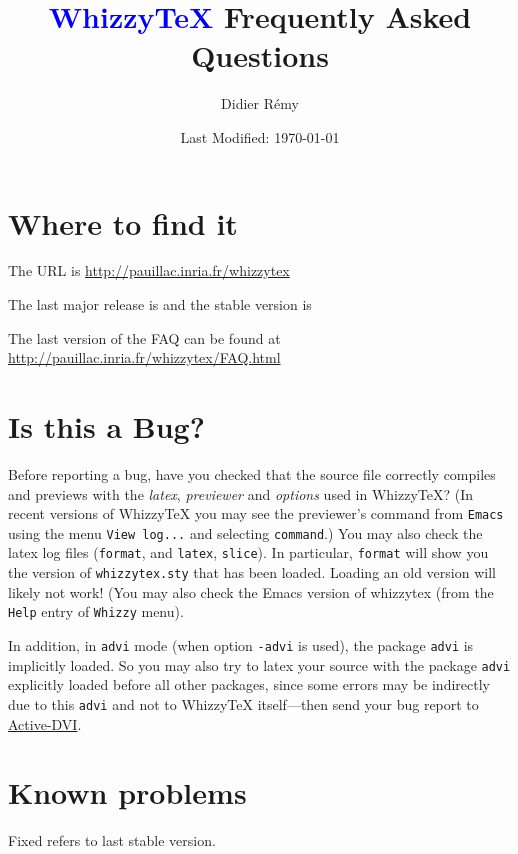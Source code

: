 \documentclass{article}
\title {\textcolor{blue}{WhizzyTeX}  Frequently Asked Questions}
\author {Didier R{\'{e}}my}
\date {Last Modified: \today}
\def \WhizzyTeX{Whizzy\TeX}
\begin{document}
\maketitle

\tableofcontents

\section {Where to find it}

The URL is \url{http://pauillac.inria.fr/whizzytex}

The last major release is {\release}
and the stable version is {\version}

The last version of the FAQ can be found at 
\url{http://pauillac.inria.fr/whizzytex/FAQ.html}

\hypertarget{isitabug}{}
\section {Is this a Bug?}

Before reporting a bug, have you checked that the source file correctly
compiles and previews with the \emph{latex}, \emph{previewer}
and \emph{options} used in {\WhizzyTeX}?
(In recent versions of {\WhizzyTeX} you may see the previewer's command from 
\texttt{Emacs} using the menu \texttt{View log...} and selecting
\texttt{command}.) You may also check the latex log files (\texttt{format}, and
\texttt{latex}, \texttt{slice}). In particular, \texttt{format} will show
you the version of \texttt{whizzytex.sty} that has been loaded. Loading an
old version will likely not work! (You may also check the Emacs version of
whizzytex (from the \texttt{Help} entry of \texttt{Whizzy} menu). 

In addition, in \texttt{advi} mode (when option \texttt{-advi} is used), the
package \texttt{advi} is implicitly loaded. So you may also try to latex
your source with the package \texttt{advi} explicitly loaded before all
other packages, since some errors may be indirectly due to this
\texttt{advi} and not to {\WhizzyTeX} itself---then send your bug report
to \href{http://pauillac.inria.fr/advi/}{Active-DVI}.



\section {Known problems}

Fixed refers to last stable version.
\def \FIXED {\textit{Fixed in versions $\ge$ {\version}}}
\end{document}
